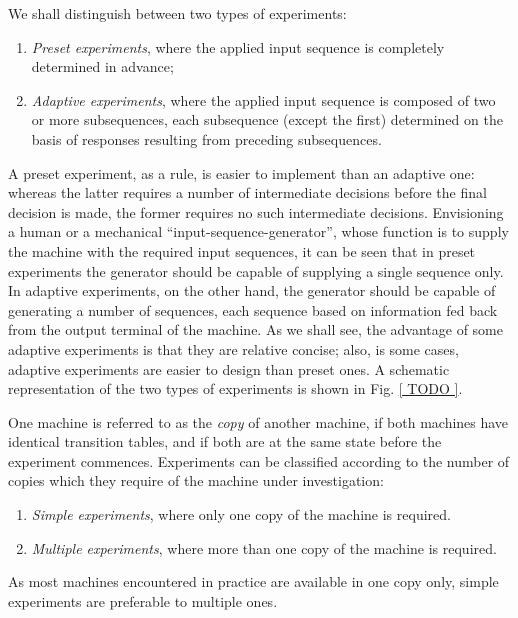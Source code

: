     We shall distinguish between two types of experiments:
\begin{enumerate}
    \item \emph{Preset experiments}, where the applied input sequence is completely determined in advance;
    \item \emph{Adaptive experiments}, where the applied input sequence is composed of two or more subsequences, each subsequence (except the first) determined on the basis of responses resulting from preceding subsequences.
\end{enumerate}

\begin{figure}
\end{figure}

    A preset experiment, as a rule, is easier to implement than an adaptive one: whereas the latter requires a number of intermediate decisions before the final decision is made, the former requires no such intermediate decisions. Envisioning a human or a mechanical ``input-sequence-generator'', whose function is to supply the machine with the required input sequences, it can be seen that in preset experiments the generator should be capable of supplying a single sequence only. In adaptive experiments, on the other hand, the generator should be capable of generating a number of sequences, each sequence based on information fed back from the output terminal of the machine. As we shall see, the advantage of some adaptive experiments is that they are relative concise; also, is some cases, adaptive experiments are easier to design than preset ones. A schematic representation of the two types of experiments is shown in Fig. \ref{ TODO }.

    One machine is referred to as the \emph{copy} of another machine, if both machines have identical transition tables, and if both are at the same state before the experiment commences. Experiments can be classified according to the number of copies which they require of the machine under investigation:

\begin{enumerate}
    \item \emph{Simple experiments}, where only one copy of the machine is required.
    \item \emph{Multiple experiments}, where more than one copy of the machine is required.
\end{enumerate}

    As most machines encountered in practice are available in one copy only, simple experiments are preferable to multiple ones.


